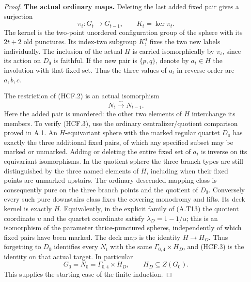 \begin{proof}
\par\medskip\noindent\textbf{The actual ordinary maps.}\quad
Deleting the last added fixed pair gives a surjection
\[
 \pi_t:G_t\longrightarrow G_{t-1},\qquad K_t=\ker\pi_t.
                                                               \tag{HCF.2}
\]
The kernel is the two-point unordered configuration group
of the sphere with its $2t+2$ old punctures.  Its index-two
subgroup $K_t^0$ fixes the two new labels individually.
The inclusion of the actual $H$ is carried isomorphically
by $\pi_t$, since its action on $D_0$ is faithful.
If the new pair is $\{p,q\}$, denote by $a_t\in H$ the
involution with that fixed set.  Thus the three values
of $a_t$ in reverse order are $a,b,c$.

The restriction of (HCF.2) is an actual isomorphism
\[
                         N_t\xrightarrow{\sim}N_{t-1}.
                                                               \tag{HCF.3}
\]
Here the added pair is unordered: the other two elements
of $H$ interchange its members.  To verify (HCF.3), use
the ordinary centralizer/quotient comparison proved in A.1.
An $H$-equivariant sphere with the marked regular quartet
$D_0$ has exactly the three additional fixed pairs, of
which any specified subset may be marked or unmarked.
Adding or deleting the entire fixed set of $a_t$ is inverse
on its equivariant isomorphisms.  In the quotient sphere
the three branch types are still distinguished by the
three named elements of $H$, including when their fixed
points are unmarked upstairs.  The ordinary descended
mapping class is consequently pure on the three branch
points and the quotient of $D_0$.  Conversely every such
pure downstairs class fixes the covering monodromy and
lifts.  Its deck kernel is exactly $H$.
Equivalently, in the explicit family of (A.T13) the
quotient coordinate $u$ and the quartet coordinate satisfy
$\lambda_D=1-1/u$; this is an isomorphism of the parameter
thrice-punctured spheres, independently of which fixed
pairs have been marked.  The deck map is the identity
$H\to H_D$.  Thus forgetting to $D_0$ identifies every
$N_t$ with the same $\Gamma_{0,4}\times H_D$, and
(HCF.3) is the identity on that actual target.
In particular
\[
       G_0=N_0=\Gamma_{0,4}\times H_D,\qquad
                        H_D\subseteq Z(G_0).           \tag{HCF.4}
\]
This supplies the starting case of the finite induction.


\end{proof}
